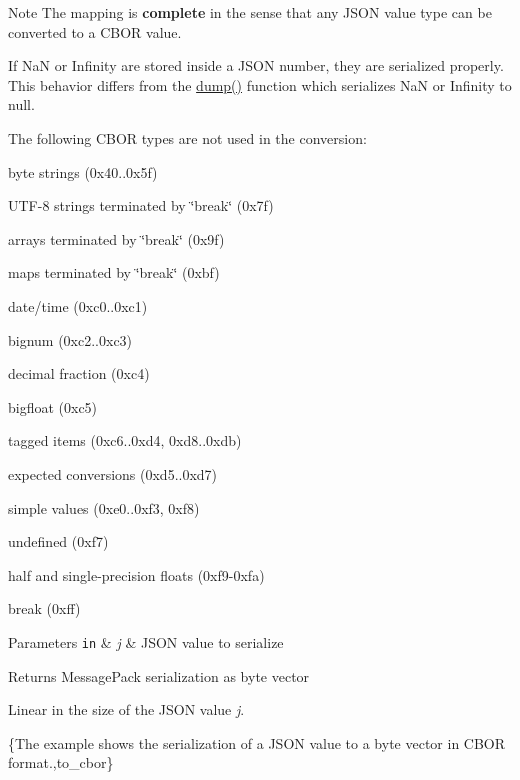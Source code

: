 \begin{DoxyNote}{Note}
The mapping is {\bfseries complete} in the sense that any J\+S\+ON value type can be converted to a C\+B\+OR value.

If NaN or Infinity are stored inside a J\+S\+ON number, they are serialized properly. This behavior differs from the \mbox{\hyperlink{classnlohmann_1_1basic__json_a5adea76fedba9898d404fef8598aa663}{dump()}} function which serializes NaN or Infinity to {\ttfamily null}.

The following C\+B\+OR types are not used in the conversion\+:
\begin{DoxyItemize}
\item byte strings (0x40..0x5f)
\item U\+T\+F-\/8 strings terminated by \char`\"{}break\char`\"{} (0x7f)
\item arrays terminated by \char`\"{}break\char`\"{} (0x9f)
\item maps terminated by \char`\"{}break\char`\"{} (0xbf)
\item date/time (0xc0..0xc1)
\item bignum (0xc2..0xc3)
\item decimal fraction (0xc4)
\item bigfloat (0xc5)
\item tagged items (0xc6..0xd4, 0xd8..0xdb)
\item expected conversions (0xd5..0xd7)
\item simple values (0xe0..0xf3, 0xf8)
\item undefined (0xf7)
\item half and single-\/precision floats (0xf9-\/0xfa)
\item break (0xff)
\end{DoxyItemize}
\end{DoxyNote}

\begin{DoxyParams}[1]{Parameters}
\mbox{\tt in}  & {\em j} & J\+S\+ON value to serialize \\
\hline
\end{DoxyParams}
\begin{DoxyReturn}{Returns}
Message\+Pack serialization as byte vector
\end{DoxyReturn}
Linear in the size of the J\+S\+ON value {\itshape j}.

\{The example shows the serialization of a J\+S\+ON value to a byte vector in C\+B\+OR format.,to\+\_\+cbor\}

